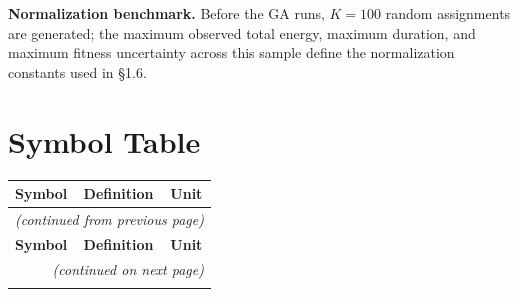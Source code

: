 \documentclass[11pt,a4paper]{article}
\begin{document}
\textbf{Normalization benchmark.} Before the GA runs, $K = 100$ random assignments are generated; the maximum observed total energy, maximum duration, and maximum fitness uncertainty across this sample define the normalization constants used in §1.6.

\section*{Symbol Table}

\renewcommand{\arraystretch}{1.15}
\begin{longtable}{p{4.5cm} p{9.5cm} p{2.5cm}}
\toprule
\textbf{Symbol} & \textbf{Definition} & \textbf{Unit} \\
\midrule
\endfirsthead

\multicolumn{3}{l}{\small\emph{(continued from previous page)}} \\
\toprule
\textbf{Symbol} & \textbf{Definition} & \textbf{Unit} \\
\midrule
\endhead

\midrule
\multicolumn{3}{r}{\small\emph{(continued on next page)}} \\
\endfoot

\bottomrule
\endlastfoot


\end{longtable}
\end{document}
